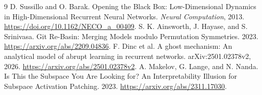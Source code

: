 \documentclass[10pt]{article}
\begin{document}
\begin{thebibliography}{9}
 D. Sussillo and O. Barak. Opening the Black Box: Low-Dimensional Dynamics in High-Dimensional Recurrent Neural Networks. \emph{Neural Computation}, 2013. \url{https://doi.org/10.1162/NECO_a_00409}.
 S. K. Ainsworth, J. Hayase, and S. Srinivasa. Git Re-Basin: Merging Models modulo Permutation Symmetries. 2023. \url{https://arxiv.org/abs/2209.04836}.
 F. Dinc et al. A ghost mechanism: An analytical model of abrupt learning in recurrent networks. arXiv:2501.02378v2, 2026. \url{https://arxiv.org/abs/2501.02378v2}.
 A. Makelov, G. Lange, and N. Nanda. Is This the Subspace You Are Looking for? An Interpretability Illusion for Subspace Activation Patching. 2023. \url{https://arxiv.org/abs/2311.17030}.
\end{thebibliography}
\end{document}
